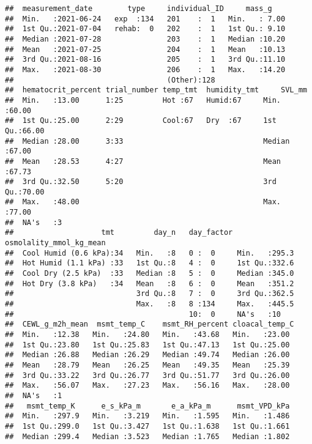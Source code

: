 \documentclass[
]{article}
\begin{document}
\begin{verbatim}
##  measurement_date        type     individual_ID     mass_g     
##  Min.   :2021-06-24   exp  :134   201    :  1   Min.   : 7.00  
##  1st Qu.:2021-07-04   rehab:  0   202    :  1   1st Qu.: 9.10  
##  Median :2021-07-28               203    :  1   Median :10.20  
##  Mean   :2021-07-25               204    :  1   Mean   :10.13  
##  3rd Qu.:2021-08-16               205    :  1   3rd Qu.:11.10  
##  Max.   :2021-08-30               206    :  1   Max.   :14.20  
##                                   (Other):128                  
##  hematocrit_percent trial_number temp_tmt  humidity_tmt     SVL_mm     
##  Min.   :13.00      1:25         Hot :67   Humid:67     Min.   :60.00  
##  1st Qu.:25.00      2:29         Cool:67   Dry  :67     1st Qu.:66.00  
##  Median :28.00      3:33                                Median :67.00  
##  Mean   :28.53      4:27                                Mean   :67.73  
##  3rd Qu.:32.50      5:20                                3rd Qu.:70.00  
##  Max.   :48.00                                          Max.   :77.00  
##  NA's   :3                                                             
##                    tmt         day_n   day_factor osmolality_mmol_kg_mean
##  Cool Humid (0.6 kPa):34   Min.   :8   0 :  0     Min.   :295.3          
##  Hot Humid (1.1 kPa) :33   1st Qu.:8   4 :  0     1st Qu.:332.6          
##  Cool Dry (2.5 kPa)  :33   Median :8   5 :  0     Median :345.0          
##  Hot Dry (3.8 kPa)   :34   Mean   :8   6 :  0     Mean   :351.2          
##                            3rd Qu.:8   7 :  0     3rd Qu.:362.5          
##                            Max.   :8   8 :134     Max.   :445.5          
##                                        10:  0     NA's   :10             
##  CEWL_g_m2h_mean  msmt_temp_C    msmt_RH_percent cloacal_temp_C 
##  Min.   :12.38   Min.   :24.80   Min.   :43.68   Min.   :23.00  
##  1st Qu.:23.80   1st Qu.:25.83   1st Qu.:47.13   1st Qu.:25.00  
##  Median :26.88   Median :26.29   Median :49.74   Median :26.00  
##  Mean   :28.79   Mean   :26.25   Mean   :49.35   Mean   :25.39  
##  3rd Qu.:33.22   3rd Qu.:26.77   3rd Qu.:51.77   3rd Qu.:26.00  
##  Max.   :56.07   Max.   :27.23   Max.   :56.16   Max.   :28.00  
##  NA's   :1                                                      
##   msmt_temp_K      e_s_kPa_m       e_a_kPa_m      msmt_VPD_kPa  
##  Min.   :297.9   Min.   :3.219   Min.   :1.595   Min.   :1.486  
##  1st Qu.:299.0   1st Qu.:3.427   1st Qu.:1.638   1st Qu.:1.661  
##  Median :299.4   Median :3.523   Median :1.765   Median :1.802  

\end{verbatim}
\end{document}
